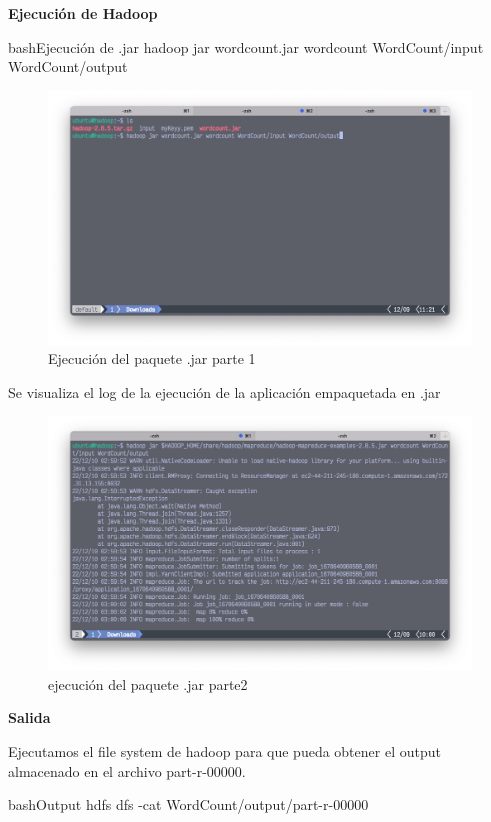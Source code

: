 \textbf{Ejecución de Hadoop}

\begin{sourcecode}[]{bash}{Ejecución de .jar}
hadoop jar wordcount.jar wordcount WordCount/input WordCount/output
\end{sourcecode}

\begin{figure}[h]
	\centering
	\includegraphics[scale=.28] {img/50-wordcount-jar}
	\caption{Ejecución del paquete .jar parte 1}
	\label{fig:50}	
\end{figure} 

Se visualiza el log de la ejecución de la aplicación empaquetada en .jar
\begin{figure}[h]
	\centering
	\includegraphics[scale=.28] {img/51-hadoop-jar-wordcloud}
	\caption{ejecución del paquete .jar parte2}
	\label{fig:51}	
\end{figure} 


\textbf{Salida}

Ejecutamos el file system de hadoop para que pueda obtener el output almacenado en el archivo part-r-00000. 
\begin{sourcecode}[]{bash}{Output}
hdfs dfs -cat WordCount/output/part-r-00000
\end{sourcecode}

